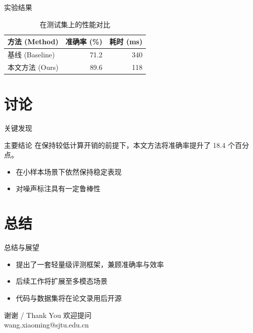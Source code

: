 \documentclass[xcolor=table,aspectratio=169]{ctexbeamer}
\begin{document}
\begin{frame}{实验结果}
  \begin{table}
    \centering
    \begin{tabular}{lrr}
      \toprule
      方法 (Method) & 准确率 (\%) & 耗时 (ms) \\
      \midrule
      基线 (Baseline) & 71.2 & 340 \\
      本文方法 (Ours) & 89.6 & 118 \\
      \bottomrule
    \end{tabular}
    \caption{在测试集上的性能对比}
  \end{table}
\end{frame}

\section{讨论}

\begin{frame}{关键发现}
  \begin{block}{主要结论}
    在保持较低计算开销的前提下，本文方法将准确率提升了 18.4 个百分点。
  \end{block}
  \begin{itemize}
    \item 在小样本场景下依然保持稳定表现
    \item 对噪声标注具有一定鲁棒性
  \end{itemize}
\end{frame}

\section{总结}

\begin{frame}{总结与展望}
  \begin{itemize}
    \item 提出了一套轻量级评测框架，兼顾准确率与效率
    \item 后续工作将扩展至多模态场景
    \item 代码与数据集将在论文录用后开源
  \end{itemize}
\end{frame}

\begin{frame}{谢谢 / Thank You}
  \centering
  \Large 欢迎提问 \\
  \normalsize wang.xiaoming@sjtu.edu.cn
\end{frame}
\end{document}
